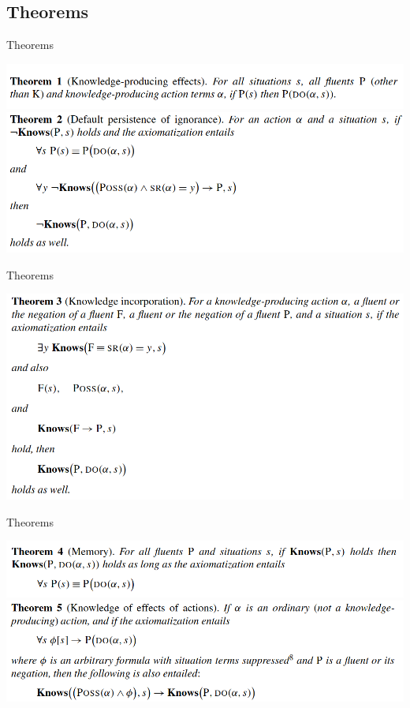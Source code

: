 \subsection{Theorems}

\begin{frame}{Theorems}

    \begin{center}
        \includegraphics{assets/theorem1.png}
        \includegraphics{assets/theorem2.png}
    \end{center}

\end{frame}    

\begin{frame}{Theorems}
    \begin{center}
        \includegraphics{assets/theorem3.png}
    \end{center}
\end{frame} 

\begin{frame}{Theorems}
    \begin{center}
        \includegraphics{assets/theorem4.png}
        \includegraphics{assets/theorem5.png}
    \end{center}
\end{frame} 

